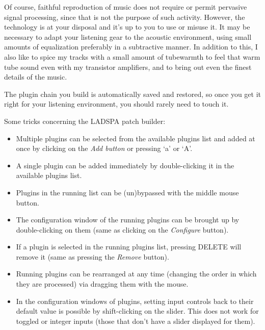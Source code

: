 \documentclass[10pt,english]{article}
\begin{document}
Of course, faithful reproduction of music does not require
or permit pervasive signal processing, since that is not the
purpose of such activity. However, the technology is at your
disposal and it's up to you to use or misuse it. It may be
necessary to adapt your listening gear to the acoustic
environment, using small amounts of equalization preferably in
a subtractive manner. In addition to this, I also like to
spice my tracks with a small amount of tubewarmth to feel that
warm tube sound even with my transistor amplifiers, and to
bring out even the finest details of the music.




The plugin chain you build is automatically saved and
restored, so once you get it right for your listening
environment, you should rarely need to touch it.




Some tricks concerning the LADSPA patch builder:


\begin{itemize}
\item 
Multiple plugins can be selected from the available
plugins list and added at once by clicking on the \textsl{Add
button} or pressing `a' or `A'.

\item 
A single plugin can be added immediately by
double-clicking it in the available plugins list.

\item 
Plugins in the running list can be (un)bypassed with the
middle mouse button.

\item 
The configuration window of the running plugins can be
brought up by double-clicking on them (same as clicking on
the \textsl{Configure} button).

\item 
If a plugin is selected in the running plugins list,
pressing DELETE will remove it (same as pressing the
\textsl{Remove} button).

\item 
Running plugins can be rearranged at any time (changing
the order in which they are processed) via dragging them
with the mouse.

\item 
In the configuration windows of plugins, setting input
controls back to their default value is possible by
shift-clicking on the slider. This does not work for
toggled or integer inputs (those that don't have a slider
displayed for them).

\end{itemize}
\end{document}
